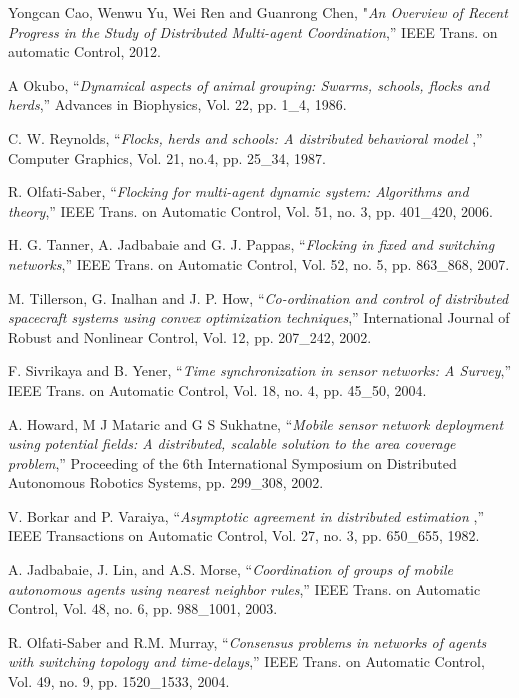 \documentclass[twocolumn]{IETEJR}
\begin{document}
\begin{thebibliography}{00}
	
 Yongcan Cao, Wenwu Yu, Wei Ren and Guanrong Chen, "{\it An Overview of Recent Progress in the Study of Distributed Multi-agent Coordination},” IEEE Trans. on automatic Control, 2012.
		
 A Okubo, “{\it Dynamical aspects of animal grouping: Swarms, schools, flocks and herds},” Advances in Biophysics, Vol. 22, pp. 1\_4, 1986.

 C. W. Reynolds, “{\it Flocks, herds and schools: A distributed behavioral model },” Computer Graphics, Vol. 21, no.4, pp. 25\_34, 1987.
	
 R. Olfati-Saber, “{\it Flocking for multi-agent dynamic system: Algorithms and theory},” IEEE Trans. on Automatic Control, Vol. 51, no. 3, pp. 401\_420, 2006.

 H. G. Tanner, A. Jadbabaie and G. J. Pappas, “{\it Flocking in fixed and switching networks},” IEEE Trans. on Automatic Control, Vol. 52, no. 5, pp. 863\_868, 2007.
	
 M. Tillerson, G. Inalhan and J. P. How, “{\it Co-ordination and control of distributed spacecraft systems using convex optimization techniques},”  International Journal of Robust and Nonlinear Control, Vol. 12, pp. 207\_242, 2002.

 F. Sivrikaya and B. Yener, “{\it Time synchronization in sensor networks: A Survey},” IEEE Trans. on Automatic Control, Vol. 18, no. 4, pp. 45\_50, 2004.

 A. Howard, M J Mataric and G S Sukhatne, “{\it Mobile sensor network deployment using potential fields: A distributed, scalable solution to the area coverage problem},”  Proceeding of the 6th International Symposium on Distributed Autonomous Robotics Systems, pp. 299\_308, 2002.

 V. Borkar and P. Varaiya, “{\it Asymptotic agreement in distributed estimation },” IEEE Transactions on Automatic Control, Vol. 27, no. 3, pp. 650\_655, 1982.

 A. Jadbabaie, J. Lin, and A.S. Morse, “{\it Coordination of groups of mobile autonomous agents using nearest neighbor rules},” IEEE Trans. on Automatic Control, Vol. 48, no. 6, pp. 988\_1001, 2003.

 R. Olfati-Saber and R.M. Murray, “{\it Consensus problems in networks of agents with switching topology and time-delays},” IEEE Trans. on Automatic Control, Vol. 49, no. 9, pp. 1520\_1533, 2004.


\end{thebibliography}
\end{document}
